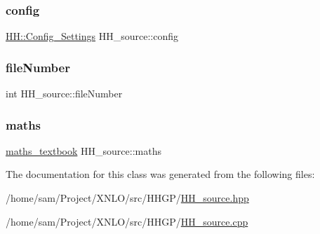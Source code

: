 \subsubsection{\texorpdfstring{config}{config}}
{\footnotesize\ttfamily \hyperlink{class_h_h_1_1_config___settings}{H\+H\+::\+Config\+\_\+\+Settings} H\+H\+\_\+source\+::config\hspace{0.3cm}{\ttfamily [private]}}

\mbox{\label{class_h_h__source_a6631481cc1bea05ab564cb1841644a12}} 
\subsubsection{\texorpdfstring{file\+Number}{fileNumber}}
{\footnotesize\ttfamily int H\+H\+\_\+source\+::file\+Number\hspace{0.3cm}{\ttfamily [private]}}

\mbox{\label{class_h_h__source_a93637ad30af846dd04eb741437114f8f}} 
\subsubsection{\texorpdfstring{maths}{maths}}
{\footnotesize\ttfamily \hyperlink{classmaths__textbook}{maths\+\_\+textbook} H\+H\+\_\+source\+::maths\hspace{0.3cm}{\ttfamily [private]}}



The documentation for this class was generated from the following files\+:\begin{DoxyCompactItemize}
\item 
/home/sam/\+Project/\+X\+N\+L\+O/src/\+H\+H\+G\+P/\hyperlink{_h_h__source_8hpp}{H\+H\+\_\+source.\+hpp}\item 
/home/sam/\+Project/\+X\+N\+L\+O/src/\+H\+H\+G\+P/\hyperlink{_h_h__source_8cpp}{H\+H\+\_\+source.\+cpp}\end{DoxyCompactItemize}
